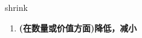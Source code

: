 
\begin{frame}
{\huge shrink}
\begin{center}
\begin{enumerate}\Large
  \item \textbf{(在数量或价值方面)降低，减小}
\end{enumerate}
\end{center}
\end{frame}
